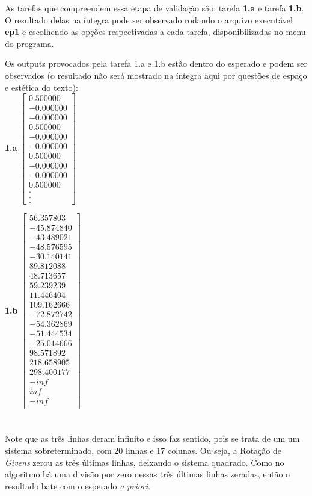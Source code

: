 \documentclass[twocolumn,amsmath,amssymb,floatfix]{revtex4}
\begin{document}
As tarefas que compreendem essa etapa de validação são: tarefa \textbf{1.a} e tarefa \textbf{1.b}. O resultado delas na íntegra pode ser observado rodando o arquivo executável \textbf{ep1} e escolhendo as opções respectivadas a cada tarefa, disponibilizadas no menu do programa. 

Os outputs provocados pela tarefa 1.a e 1.b estão dentro do esperado e podem ser observados (o resultado não será mostrado na íntegra aqui por questões de espaço e estética do texto):\\

\textbf{1.a}
$
\begin{bmatrix}
0.500000 \\	
-0.000000 \\
-0.000000 \\ 	
0.500000 \\	
-0.000000 \\	
-0.000000 \\	
0.500000 \\	
-0.000000 \\	
-0.000000 \\	
0.500000 \\
	.  \\
	.  \\
	.  
\end{bmatrix}
$

\textbf{1.b}
$
\begin{bmatrix}
56.357803 \\	
-45.874840 \\	
-43.489021 \\	
-48.576595 \\	
-30.140141 \\	
89.812088 \\	
48.713657 \\	
59.239239 \\	
11.446404 \\	
109.162666 \\	
-72.872742 \\ 	
-54.362869 \\	
-51.444534 \\	
-25.014666 \\	
98.571892  \\
218.658905 \\	
298.400177 \\	
-inf \\
inf  \\ 	
-inf \\
\end{bmatrix}
$
\\\\\\
Note que as três linhas deram infinito e isso faz sentido, pois se trata de um um sistema sobreterminado, com 20 linhas e 17 colunas. Ou seja, a Rotação de \textit{Givens} zerou as três últimas linhas, deixando o sistema quadrado. Como no algoritmo há uma divisão por zero nessas três últimas linhas zeradas, então o resultado bate com o esperado \textit{a priori}.
\end{document}
